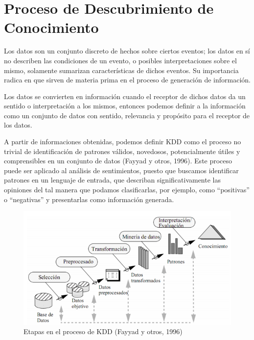 \section{Proceso de Descubrimiento de Conocimiento}
{Los datos son un conjunto discreto de hechos sobre ciertos eventos; los datos en s\'i no describen las condiciones de un evento, o posibles interpretaciones sobre el mismo, solamente sumarizan caracter\'isticas de dichos eventos. Su importancia radica en que sirven de materia prima en el proceso de generaci\'on de informaci\'on.
\newline

Los datos se convierten en informaci\'on cuando el receptor de dichos datos da un sentido o interpretaci\'on a los mismos, entonces podemos definir a la informaci\'on como un conjunto de datos con sentido, relevancia y prop\'osito para el receptor de los datos.
\newline

A partir de informaciones obtenidas, podemos definir KDD como el proceso no trivial de identificaci\'on de patrones v\'alidos, novedosos, potencialmente \'utiles y comprensibles en un conjunto de datos (Fayyad y otros, 1996). Este proceso puede ser aplicado al an\'alisis de sentimientos, puesto que buscamos identificar patrones en un lenguaje de entrada, que describan significativamente las opiniones del tal manera que podamos clasificarlas, por ejemplo, como ``positivas'' o ``negativas'' y presentarlas como informaci\'on generada.
\newline 

\begin{figure}[h]
\centering
\includegraphics[width=1 \textwidth]{etapaskdd.png}
\caption{Etapas en el proceso de KDD (Fayyad y otros, 1996)}
\label{etapaskdd}
\end{figure}

}
